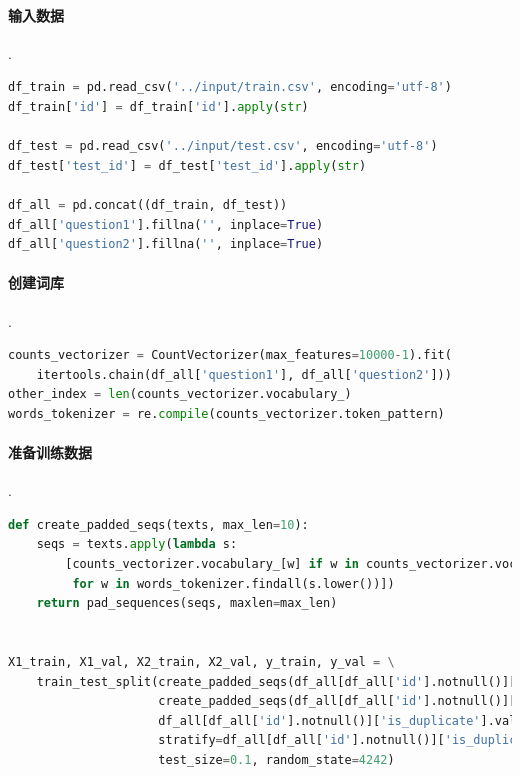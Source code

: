 \documentclass{article}
\begin{document}
\paragraph{输入数据} .

\begin{lstlisting}[language=python]
df_train = pd.read_csv('../input/train.csv', encoding='utf-8')
df_train['id'] = df_train['id'].apply(str)

df_test = pd.read_csv('../input/test.csv', encoding='utf-8')
df_test['test_id'] = df_test['test_id'].apply(str)

df_all = pd.concat((df_train, df_test))
df_all['question1'].fillna('', inplace=True)
df_all['question2'].fillna('', inplace=True)
\end{lstlisting}

\paragraph{创建词库} .

\begin{lstlisting}[language=python]
counts_vectorizer = CountVectorizer(max_features=10000-1).fit(
    itertools.chain(df_all['question1'], df_all['question2']))
other_index = len(counts_vectorizer.vocabulary_)
words_tokenizer = re.compile(counts_vectorizer.token_pattern)
\end{lstlisting}

\paragraph{准备训练数据} .

\begin{lstlisting}[language=python]
def create_padded_seqs(texts, max_len=10):
    seqs = texts.apply(lambda s:
        [counts_vectorizer.vocabulary_[w] if w in counts_vectorizer.vocabulary_ else other_index
         for w in words_tokenizer.findall(s.lower())])
    return pad_sequences(seqs, maxlen=max_len)


X1_train, X1_val, X2_train, X2_val, y_train, y_val = \
    train_test_split(create_padded_seqs(df_all[df_all['id'].notnull()]['question1']),
                     create_padded_seqs(df_all[df_all['id'].notnull()]['question2']),
                     df_all[df_all['id'].notnull()]['is_duplicate'].values,
                     stratify=df_all[df_all['id'].notnull()]['is_duplicate'].values,
                     test_size=0.1, random_state=4242)
\end{lstlisting}
\end{document}
